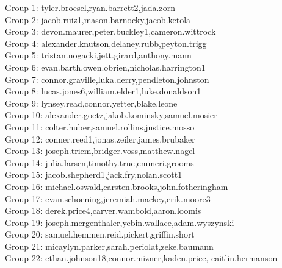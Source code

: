 \documentclass[10pt]{beamer}
\begin{document}
\begin{frame}
\footnotesize
Group 1: tyler.broesel,ryan.barrett2,jada.zorn\\
Group 2: jacob.ruiz1,mason.barnocky,jacob.ketola\\
Group 3: devon.maurer,peter.buckley1,cameron.wittrock\\
Group 4: alexander.knutson,delaney.rubb,peyton.trigg\\
Group 5: tristan.nogacki,jett.girard,anthony.mann\\
Group 6: evan.barth,owen.obrien,nicholas.harrington1\\
Group 7: connor.graville,luka.derry,pendleton.johnston\\
Group 8: lucas.jones6,william.elder1,luke.donaldson1\\
Group 9: lynsey.read,connor.yetter,blake.leone\\
Group 10: alexander.goetz,jakob.kominsky,samuel.mosier\\
Group 11: colter.huber,samuel.rollins,justice.mosso\\
Group 12: conner.reed1,jonas.zeiler,james.brubaker\\
Group 13: joseph.triem,bridger.voss,matthew.nagel\\
Group 14: julia.larsen,timothy.true,emmeri.grooms\\
Group 15: jacob.shepherd1,jack.fry,nolan.scott1\\
Group 16: michael.oswald,carsten.brooks,john.fotheringham\\
Group 17: evan.schoening,jeremiah.mackey,erik.moore3\\
Group 18: derek.price4,carver.wambold,aaron.loomis\\
Group 19: joseph.mergenthaler,yebin.wallace,adam.wyszynski\\
Group 20: samuel.hemmen,reid.pickert,griffin.short\\
Group 21: micaylyn.parker,sarah.periolat,zeke.baumann\\
Group 22: ethan.johnson18,connor.mizner,kaden.price, caitlin.hermanson\\
\end{frame}
\end{document}
